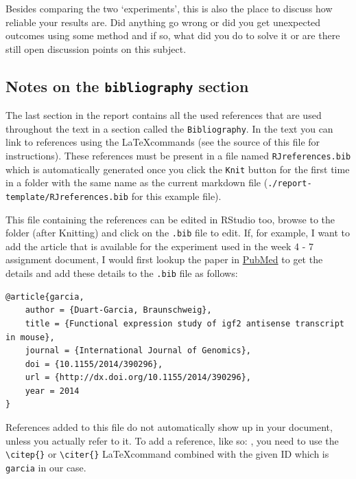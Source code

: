 Besides comparing the two `experiments', this is also the place to
discuss how reliable your results are. Did anything go wrong or did you
get unexpected outcomes using some method and if so, what did you do to
solve it or are there still open discussion points on this subject.

\hypertarget{notes-on-the-bibliography-section}{%
\subsection{\texorpdfstring{Notes on the \texttt{bibliography}
section}{Notes on the bibliography section}}\label{notes-on-the-bibliography-section}}

The last section in the report contains all the used references that are
used throughout the text in a section called the \texttt{Bibliography}.
In the text you can link to references using the \LaTeX commands (see
the source of this file for instructions). These references must be
present in a file named \texttt{RJreferences.bib} which is automatically
generated once you click the \texttt{Knit} button for the first time in
a folder with the same name as the current markdown file
(\texttt{./report-template/RJreferences.bib} for this example file).

This file containing the references can be edited in RStudio too, browse
to the folder (after Knitting) and click on the \texttt{.bib} file to
edit. If, for example, I want to add the article that is available for
the experiment used in the week 4 - 7 assignment document, I would first
lookup the paper in
\href{http://www.ncbi.nlm.nih.gov/pmc/articles/PMC3914337/}{PubMed} to
get the details and add these details to the \texttt{.bib} file as
follows:

\begin{verbatim}
@article{garcia,
    author = {Duart-Garcia, Braunschweig},
    title = {Functional expression study of igf2 antisense transcript in mouse},
    journal = {International Journal of Genomics},
    doi = {10.1155/2014/390296},
    url = {http://dx.doi.org/10.1155/2014/390296},
    year = 2014
}
\end{verbatim}

References added to this file do not automatically show up in your
document, unless you actually refer to it. To add a reference, like so:
\citep{garcia:2014}, you need to use the
\texttt{\textbackslash{}citep\{\}} or \texttt{\textbackslash{}citer\{\}}
\LaTeX command combined with the given ID which is \texttt{garcia} in
our case.




\address{%
Marcel Kempenaar\\
Hanze University of Applied Sciences\\%
Zernikeplein 11\\ room D1.12\\
%
%
%
\href{mailto:m.kempenaar@pl.hanze.nl}{\nolinkurl{m.kempenaar@pl.hanze.nl}}%
}

\address{%
Author Two\\
Affiliation\\%
line 1\\ line 2\\
%
%
%
\href{mailto:author2@work}{\nolinkurl{author2@work}}%
}
